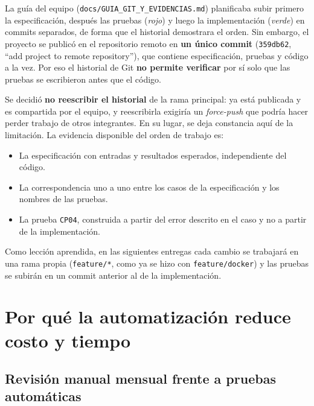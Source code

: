 \documentclass[11pt,a4paper]{article}
\begin{document}
La guía del equipo (\texttt{docs/GUIA\_GIT\_Y\_EVIDENCIAS.md}) planificaba subir primero la
especificación, después las pruebas (\emph{rojo}) y luego la implementación (\emph{verde}) en commits
separados, de forma que el historial demostrara el orden. Sin embargo, el proyecto se publicó en el
repositorio remoto en \textbf{un único commit} (\texttt{359db62}, ``add project to remote
repository''), que contiene especificación, pruebas y código a la vez. Por eso el historial de Git
\textbf{no permite verificar} por sí solo que las pruebas se escribieron antes que el código.

Se decidió \textbf{no reescribir el historial} de la rama principal: ya está publicada y es compartida
por el equipo, y reescribirla exigiría un \emph{force-push} que podría hacer perder trabajo de otros
integrantes. En su lugar, se deja constancia aquí de la limitación. La evidencia disponible del orden
de trabajo es:

\begin{itemize}[noitemsep]
  \item La especificación con entradas y resultados esperados, independiente del código.
  \item La correspondencia uno a uno entre los casos de la especificación y los nombres de las pruebas.
  \item La prueba \texttt{CP04}, construida a partir del error descrito en el caso y no a partir de la
        implementación.
\end{itemize}

Como lección aprendida, en las siguientes entregas cada cambio se trabajará en una rama propia
(\texttt{feature/*}, como ya se hizo con \texttt{feature/docker}) y las pruebas se subirán en un
commit anterior al de la implementación.

\section{Por qué la automatización reduce costo y tiempo}
\label{sec:costos}

\subsection{Revisión manual mensual frente a pruebas automáticas}
\end{document}
